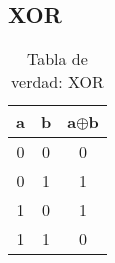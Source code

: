 \subsection{XOR}
\begin{table}[!ht]
    \centering
    \begin{tabular}{|c|c|c|}
        \hline
        a & b & a$\oplus$b\\
        \hline
        0 & 0 & 0 \\
        \hline
        0 & 1 & 1 \\
        \hline
        1 & 0 & 1 \\
        \hline
        1 & 1 & 0 \\
        \hline
    \end{tabular}
    \caption{Tabla de verdad: XOR}\label{table:xor}
\end{table}